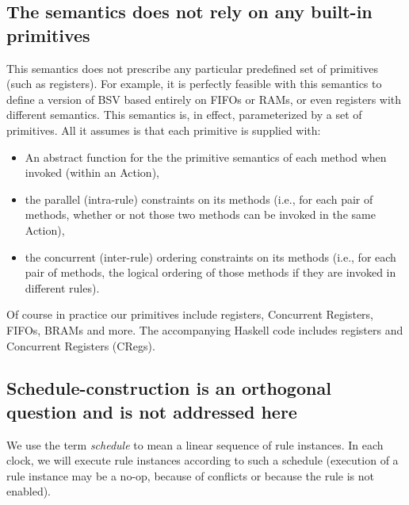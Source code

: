 \documentclass[11pt]{article}
\begin{document}

\subsection{The semantics does not rely on any built-in primitives}

This semantics does not prescribe any particular predefined set of
primitives (such as registers).  For example, it is perfectly feasible
with this semantics to define a version of BSV based entirely on FIFOs
or RAMs, or even registers with different semantics.  This semantics
is, in effect, parameterized by a set of primitives.  All it assumes
is that each primitive is supplied with:

\begin{itemize}

\item An abstract function for the the primitive semantics of each
method when invoked (within an Action),

\item the parallel (intra-rule) constraints on its methods (i.e., for
each pair of methods, whether or not those two methods can be invoked
in the same Action),

\item the concurrent (inter-rule) ordering constraints on its methods
(i.e., for each pair of methods, the logical ordering of those methods
if they are invoked in different rules).
\end{itemize}

Of course in practice our primitives include registers, Concurrent
Registers, FIFOs, BRAMs and more.  The accompanying Haskell code
includes registers and Concurrent Registers (CRegs).


\subsection{Schedule-construction is an orthogonal question and is not addressed here}

\label{sec_schedules}

We use the term \emph{schedule} to mean a linear sequence of rule
instances.  In each clock, we will execute rule instances according to
such a schedule (execution of a rule instance may be a no-op, because
of conflicts or because the rule is not enabled).
\end{document}
